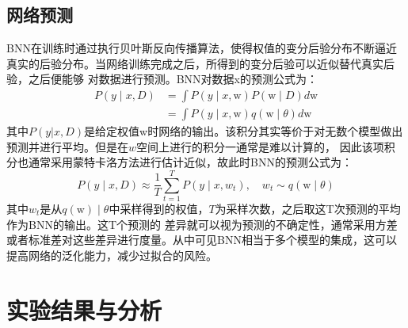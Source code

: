 \subsection{网络预测}
BNN在训练时通过执行贝叶斯反向传播算法，使得权值的变分后验分布不断逼近真实的后验分布。当网络训练完成之后，所得到的变分后验可以近似替代真实后验，之后便能够
对数据进行预测。BNN对数据x的预测公式为：
\begin{equation}
	\label{}
	\begin{aligned}
	P(y \mid x, D) & =\int P(y \mid x, \mathrm{w}) P(\mathrm{w} \mid D) d \mathrm{w} \\
	& =\int P(y \mid x, \mathrm{w}) q(\mathrm{w} \mid \theta) d \mathrm{w}
	\end{aligned}
\end{equation}
其中$P(y|x,D)$是给定权值w时网络的输出。该积分其实等价于对无数个模型做出预测并进行平均。但是在$w$空间上进行的积分一通常是难以计算的，
因此该项积分也通常采用蒙特卡洛方法进行估计近似，故此时BNN的预测公式为：
\begin{equation}
	\label{}
	P(y \mid x, D) \approx \frac{1}{T} \sum_{t=1}^T P\left(y \mid x, w_t\right), \quad w_t \sim q(\mathrm{w} \mid \theta)
\end{equation}
其中$w_t$是从$q(\mathrm{w})\mid\theta$中采样得到的权值，$T$为采样次数，之后取这T次预测的平均作为BNN的输出。这T个预测的
差异就可以视为预测的不确定性，通常采用方差或者标准差对这些差异进行度量。从中可见BNN相当于多个模型的集成，这可以提高网络的泛化能力，减少过拟合的风险。
%

%
\section{实验结果与分析}

